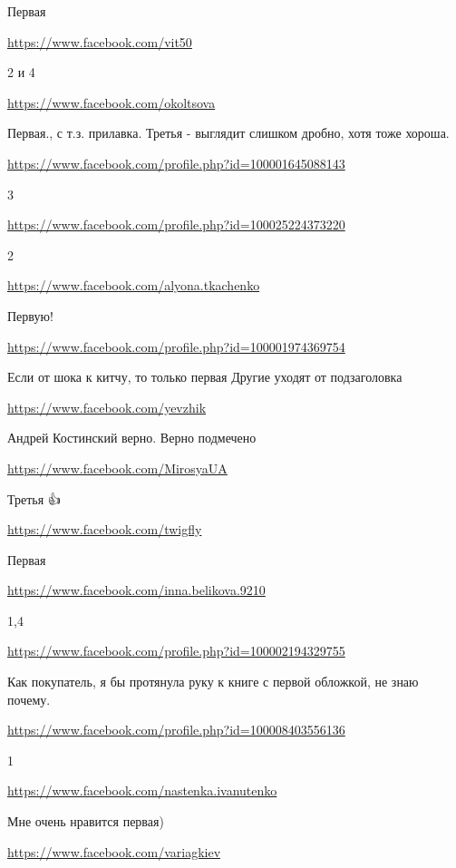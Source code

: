 \documentclass[a4paper,11pt]{extreport}
\begin{document}
\begin{itemize}
Первая

\url{https://www.facebook.com/vit50}

2 и 4

\url{https://www.facebook.com/okoltsova}

Первая., с т.з. прилавка. Третья - выглядит слишком дробно, хотя тоже хороша.

\url{https://www.facebook.com/profile.php?id=100001645088143}

3

\url{https://www.facebook.com/profile.php?id=100025224373220}

2

\url{https://www.facebook.com/alyona.tkachenko}

Первую!

\url{https://www.facebook.com/profile.php?id=100001974369754}

Если от шока к китчу, то только первая
Другие уходят от подзаголовка

\begin{itemize}
\url{https://www.facebook.com/yevzhik}

Андрей Костинский верно. Верно подмечено

\end{itemize}
\url{https://www.facebook.com/MirosyaUA}

Третья 👍

\url{https://www.facebook.com/twigfly}

Первая

\url{https://www.facebook.com/inna.belikova.9210}

1,4

\url{https://www.facebook.com/profile.php?id=100002194329755}

Как покупатель, я бы протянула руку к книге с первой обложкой, не знаю почему.

\url{https://www.facebook.com/profile.php?id=100008403556136}

1

\url{https://www.facebook.com/nastenka.ivanutenko}

Мне очень нравится первая)

\url{https://www.facebook.com/variagkiev}


\end{itemize}
\end{document}
